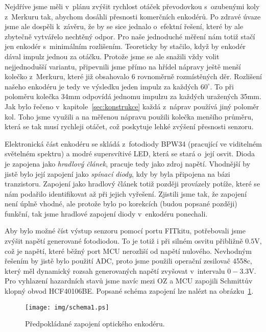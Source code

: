 Nejdříve jsme měli v~plánu zvýšit rychlost otáček převodovkou s~ozubenými koly z~Merkuru tak, abychom dosáhli přesnosti komerčních enkodérů. Po zdravé úvaze jsme ale dospěli k~závěru, že by se sice jednalo o~efektní řešení, které by ale zbytečně vytvářelo nechtěný odpor. Pro naše jednoduché měření nám totiž stačí jen enkodér s~minimálním rozlišením. Teoreticky by stačilo, když by enkodér dával impulz jednou za otáčku. Protože jsme se ale snažili vždy volit nejjednodušší variantu, připevnili jsme přímo na hřídel nápravy ještě menší kolečko z~Merkuru, které již obsahovalo 6 rovnoměrně rozmístěných děr. Rozlišení našeho enkodéru je tedy ve výsledku jeden impulz za každých $60^\circ$. To při poloměru kolečka 34mm odpovídá jednomu impulzu za každých uražených 35mm. Jak bylo řečeno v~kapitole~\ref{sec:konstrukce} každá z~náprav používá jiný poloměr kol. Toho jsme využili a na měřenou nápravu použili kolečka menšího průměru, která se tak musí rychleji otáčet, což poskytuje lehké zvýšení přesnosti senzoru.

Elektronická část enkodéru se skládá z~fotodiody BPW34 (pracující ve viditelném světelném spektru) a modré supersvítivé LED, která se stará o~její osvit. Dioda je zapojena jako \emph{hradlový článek}, pracuje tedy jako zdroj napětí. Vhodnější by jistě bylo její zapojení jako \emph{spínací diody}, kdy by byla připojena na bázi tranzistoru. Zapojení jako hradlový článek totiž později provázely potíže, které se nám podařilo identifikovat až při jejich vyřešení. Zjistili jsme tak, že zapojení není úplně vhodné, ale protože bylo po korekcích (budou popsané později) funkční, tak jsme hradlové zapojení diody v~enkodéru ponechali.

Aby bylo možné číst výstup senzoru pomocí portu FITkitu, potřebovali jsme zvýšit napětí generované fotodiodou. To je totiž i při silném osvitu přibližně $0.5$V, což je napětí, které běžný port MCU nerozliší od napětí nulového. Nevhodným řešením by jistě bylo použití ADC, proto jsme použili operační zesilovač 4558c, který měl dynamický rozsah generovaných napětí zvyšovat v~intervalu $0-3.3$V. Pro vyhlazení hazardních stavů jsme navíc mezi OZ a MCU zapojili Schmittův klopný obvod HCF40106BE. Popsané schéma zapojení lze nalézt na obrázku~\ref{fig:schema1}.

\begin{figure}[h]
\centering
\texttt{[image: img/schema1.ps]}
\caption{Předpokládané zapojení optického enkodéru.}
\label{fig:schema1}
\end{figure}

